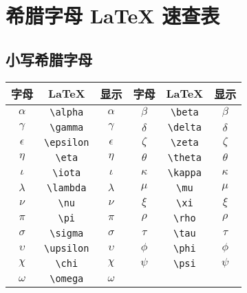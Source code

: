 \documentclass[a4paper,12pt]{article}
\begin{document}
    \section*{希腊字母 LaTeX 速查表}

    \subsection*{小写希腊字母}
    \begin{tabular}{c c c c c c}
        \hline
        字母         & LaTeX           & 显示         & 字母       & LaTeX         & 显示       \\
        \hline
        $\alpha$   & \verb|\alpha|   & $\alpha$   & $\beta$  & \verb|\beta|  & $\beta$  \\
        $\gamma$   & \verb|\gamma|   & $\gamma$   & $\delta$ & \verb|\delta| & $\delta$ \\
        $\epsilon$ & \verb|\epsilon| & $\epsilon$ & $\zeta$  & \verb|\zeta|  & $\zeta$  \\
        $\eta$     & \verb|\eta|     & $\eta$     & $\theta$ & \verb|\theta| & $\theta$ \\
        $\iota$    & \verb|\iota|    & $\iota$    & $\kappa$ & \verb|\kappa| & $\kappa$ \\
        $\lambda$  & \verb|\lambda|  & $\lambda$  & $\mu$    & \verb|\mu|    & $\mu$    \\
        $\nu$      & \verb|\nu|      & $\nu$      & $\xi$    & \verb|\xi|    & $\xi$    \\
        $\pi$      & \verb|\pi|      & $\pi$      & $\rho$   & \verb|\rho|   & $\rho$   \\
        $\sigma$   & \verb|\sigma|   & $\sigma$   & $\tau$   & \verb|\tau|   & $\tau$   \\
        $\upsilon$ & \verb|\upsilon| & $\upsilon$ & $\phi$   & \verb|\phi|   & $\phi$   \\
        $\chi$     & \verb|\chi|     & $\chi$     & $\psi$   & \verb|\psi|   & $\psi$   \\
        $\omega$   & \verb|\omega|   & $\omega$   &          &               &          \\
        \hline
    \end{tabular}
\end{document}
